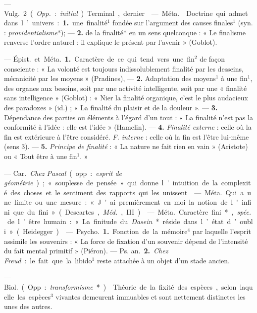 \begin{itemize}[leftmargin=1cm, label=, itemsep=1pt]
— \si{Vulg.} 2 ({\it Opp.} : {\it initial}). Terminal, dernier.

 — \si{Méta.}  Doctrine qui
admet dans l’univers : {\bf 1.} une finalité$^1$ fondée sur l'argument des
causes finales$^1$ (syn. : {\it providentialisme}*); — {\bf 2.} de la
finalité* en un sens quelconque : « Le finalisme renverse l’ordre naturel :
il explique le présent par l'avenir » (Goblot).

 — \si{Épist.} et \si{Méta.} {\bf 1.} Caractère de ce qui tend
vers une fin$^2$ de façon consciente : « La volonté est toujours
indissolublement finalité par les desseins, mécanicité par les moyens
 » (Pradines), — {\bf 2.} Adaptation des moyens$^1$ à une fin$^1$, des
organes aux besoins, soit par une activité intelligente, soit par une
« finalité sans intelligence » (Goblot) : « Nier la finalité organique, c'est
le plus audacieux des paradoxes » (id.) ; « La finalité du plaisir et de la
douleur ».
— {\bf 3.} Dépendance des parties ou éléments à l'égard d’un tout :
« La finalité n’est pas la conformité à l’idée : elle est l'idée » (Hamelin).
— {\bf 4.} {\it Finalité externe} : celle où la fin est extérieure à l'être
considéré. {\it F. interne} : celle où la fin est l'être lui-même (sens 3).
— {\bf 5.} {\it Principe de finalité} : « La nature ne fait rien en
vain » (Aristote) ou « Tout être à une fin$^1$. »

 — \si{Car.} {\it Chez Pascal} (opp. :
{\it esprit de géométrie}) ; « souplesse de pensée » qui donne l'intuition de
la complexité des choses et le sentiment des rapports qui les unissent.

 — \si{Méta.} Qui a une limite ou une mesure : « J’ai premièrement en
moi la notion de l'infini que du fini» (Descartes, {\it Méd.}, III).

 — \si{Méta.} Caractère fini*, {\it spéc.} de l'être humain :
« La finitude du {\it Dasein}* réside dans l’état d’oubli » (Heidegger).

 — \si{Psycho.} {\bf 1.} Fonction de la
mémoire$^4$ par laquelle l’esprit assimile les souvenirs : « La force de
fixation d’un souvenir dépend de l'intensité du fait mental primitif »
(Piéron). — \si{Ps. an.} {\bf 2.} {\it Chez Freud} :
le fait que la libido$^1$ reste attachée à un objet d’un stade ancien.

 — \si{Biol.} (Opp. : {\it transformisme}*). 
Théorie de la fixité des espèces, selon laquelle les espèces$^3$ vivantes
demeurent immuables et sont nettement distinctes les unes des autres.


\end{itemize}
